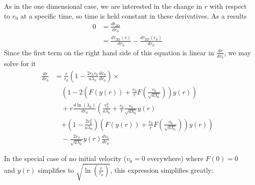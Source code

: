 \documentclass[aps,prl,twocolumn,showpacs,superscriptaddress,groupedaddress]{revtex4-1}  %
\begin{document}
As in the one dimensional case, we are interested in the change in $r$ with respect to $r_0$ at a specific time, so time  is held constant in these derivatives.  As a results
\begin{align}
 0 &= \frac{d t_\text{2D}}{d r_0} \nonumber\\
    &=  \frac{d \tau_\text{2D}(r)}{d r_0} -  \frac{d \tau_\text{2D}(r_0)}{d r_0}
\end{align}
Since the first term on the right hand side of this equation is linear in $\frac{d r}{d r_0}$, we may solve for it
\begin{align}
  \frac{d r}{d r_0} &= \frac{r}{r_0}\left(1- \frac{2 r_0 v_0 }{a\lambda_0}\frac{d v_0}{d r_0} \right) \times\nonumber\\
                           &\quad \left(1 - 2\left(F(y(r)) + \frac{r_0}{r}F\left(\frac{v_0}{\sqrt{a \lambda_0}}\right)\right) y(r)\right)\nonumber\\
                           &\quad +  r \frac{d\ln(\lambda_0)}{d r_0} \left( \frac{v_0^2}{a \lambda_0} + \frac{r_0}{r}\frac{v_0}{\sqrt{a \lambda_0}} y(r) \right.\nonumber\\
                           &\quad \left.+ \left(1 - \frac{2 v_0^2}{a \lambda_0}\right)\left(F(y(r)) + \frac{r_0}{r}F\left(\frac{v_0}{\sqrt{a \lambda_0}}\right)\right)y(r)\right)\nonumber\\   
                           &\quad - \frac{2 r_0 }{\sqrt{a\lambda_0}}y(r)\frac{d v_0}{d r_0}\label{eq:2D dr over dr_0}
\end{align}

In the special case of no initial velocity ($v_0 = 0$ everywhere) where $F(0) =0$ and $y(r)$ simplifies to $\sqrt{\ln \left(\frac{r}{r_0}\right)}$, this expression simplifies greatly:
\end{document}

